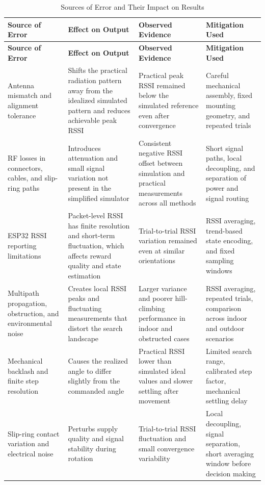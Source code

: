 \vspace{0.5cm}
\renewcommand{\arraystretch}{1.25}
\begin{longtable}{|
>{\raggedright\arraybackslash}p{3cm}|
>{\raggedright\arraybackslash}p{3.2cm}|
>{\raggedright\arraybackslash}p{3cm}|
>{\raggedright\arraybackslash}p{4.45cm}|}
\caption{Sources of Error and Their Impact on Results}
\label{tab:error_analysis}\\
\hline
\textbf{Source of Error} & \textbf{Effect on Output} & \textbf{Observed Evidence} & \textbf{Mitigation Used} \\
\hline
\endfirsthead
\hline
\textbf{Source of Error} & \textbf{Effect on Output} & \textbf{Observed Evidence} & \textbf{Mitigation Used} \\
\hline
\endhead
Antenna mismatch and alignment tolerance & Shifts the practical radiation pattern away from the idealized simulated pattern and reduces achievable peak RSSI & Practical peak RSSI remained below the simulated reference even after convergence & Careful mechanical assembly, fixed mounting geometry, and repeated trials \\
\hline
RF losses in connectors, cables, and slip-ring paths & Introduces attenuation and small signal variation not present in the simplified simulator & Consistent negative RSSI offset between simulation and practical measurements across all methods & Short signal paths, local decoupling, and separation of power and signal routing \\
\hline
ESP32 RSSI reporting limitations & Packet-level RSSI has finite resolution and short-term fluctuation, which affects reward quality and state estimation & Trial-to-trial RSSI variation remained even at similar orientations & RSSI averaging, trend-based state encoding, and fixed sampling windows \\
\hline
Multipath propagation, obstruction, and environmental noise & Creates local RSSI peaks and fluctuating measurements that distort the search landscape & Larger variance and poorer hill-climbing performance in indoor and obstructed cases & RSSI averaging, repeated trials, comparison across indoor and outdoor scenarios \\
\hline
Mechanical backlash and finite step resolution & Causes the realized angle to differ slightly from the commanded angle & Practical RSSI lower than simulated ideal values and slower settling after movement & Limited search range, calibrated step factor, mechanical settling delay \\
\hline
Slip-ring contact variation and electrical noise & Perturbs supply quality and signal stability during rotation & Trial-to-trial RSSI fluctuation and small convergence variability & Local decoupling, signal separation, short averaging window before decision making \\

\end{longtable}
